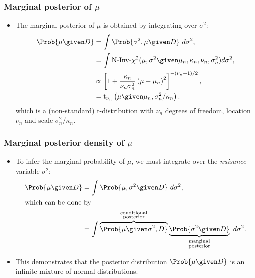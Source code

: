 \documentclass{slides}
\begin{document}
\begin{frame}
	\frametitle{Marginal posterior of $\mu$}

	\begin{itemize}
		\item The marginal posterior of $\mu$ is obtained by integrating over $\sigma^2$:
			\begin{align*}
				\Prob{\mu \given D} &= \int \Prob{\sigma^2, \mu\given D}\ d\sigma^2,\\
				&= \int \textrm{N-Inv-}\chi^2(\mu, \sigma^2 \given \mu_n, \kappa_n, \nu_n, \sigma_n^2) d\sigma^2,\\
				&\propto \left[ 1 + \frac{\kappa_n}{\nu_n \sigma_n^2}\left(\mu-\mu_n\right)^2\right]^{-(\nu_n+1)/2},\\
				&= \textrm{t}_{\nu_n}\left(\mu \given \mu_n, \sigma^2_n/\kappa_n\right).
			\end{align*}
		which is a (non-standard) t-distribution with $\nu_n$ degrees of freedom, location $\nu_n$ and scale $\sigma^2_n/\kappa_n$.
	\end{itemize}
\end{frame}

\begin{frame}
	\frametitle{Marginal posterior density of $\mu$}
	\begin{itemize}
		\item To infer the marginal probability of $\mu$, we must integrate over the \emph{nuisance} variable $\sigma^2$:
			\begin{align*}
				\Prob{\mu\given D} &= \int \Prob{\mu, \sigma^2 \given D}\ d\sigma^2,\\
			\intertext{which can be done by}
			&= \int \overbrace{\Prob{\mu\given \sigma^2, D}}^{\substack{\text{conditional}\\\text{posterior}}}
			\underbrace{\Prob{\sigma^2\given D}}_{\substack{\text{marginal}\\\text{posterior}}}\ d\sigma^2.
			\end{align*}
		\item This demonstrates that the posterior distribution $\Prob{\mu\given D}$ is an infinite mixture of normal distributions.
	\end{itemize}
\end{frame}
\end{document}
